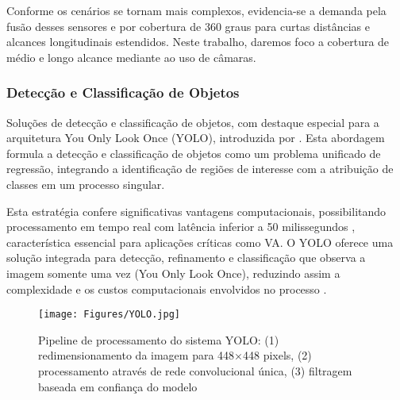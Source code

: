 Conforme os cenários se tornam mais complexos, evidencia-se a demanda pela fusão desses sensores e por cobertura de 360 graus para curtas distâncias e alcances longitudinais estendidos. Neste trabalho, daremos foco a cobertura de médio e longo alcance mediante ao uso de câmaras. %

\subsubsection{Detecção e Classificação de Objetos} \label{yolo_section}


 Soluções de detecção e classificação de objetos, com destaque especial para a arquitetura You Only Look Once (YOLO), introduzida por . Esta abordagem formula a detecção e classificação de objetos como um problema unificado de regressão, integrando a identificação de regiões de interesse com a atribuição de classes em um processo singular.

Esta estratégia confere significativas vantagens computacionais, possibilitando processamento em tempo real com latência inferior a 50 milissegundos \cite[p. ~1]{redmon2016lookonceunifiedrealtime}, característica essencial para aplicações críticas como VA. O YOLO oferece uma solução integrada para detecção, refinamento e classificação que observa a imagem somente uma vez (You Only Look Once), reduzindo assim a complexidade e os custos computacionais envolvidos no processo \cite{redmon2016lookonceunifiedrealtime}.

\begin{figure}[H]
\centering
\texttt{[image: Figures/YOLO.jpg]}
\caption{Pipeline de processamento do sistema YOLO: (1) redimensionamento da imagem para 448×448 pixels, (2) processamento através de rede convolucional única, (3) filtragem baseada em confiança do modelo \cite[p. ~1]{redmon2016lookonceunifiedrealtime}}
\label{YOLO_}
\end{figure}

